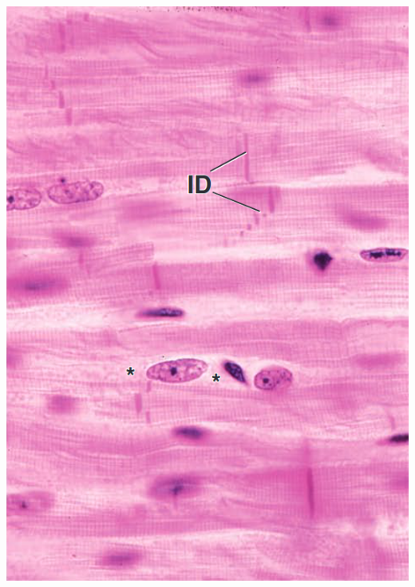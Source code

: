 \begin{itemize}
\begin{center}
    \includegraphics[scale=0.18]{images/week-1-rp8.png}

\end{center}
\end{itemize}
